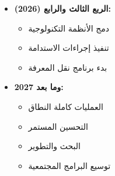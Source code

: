 \begin{itemize}
    \item \textbf{الربع الثالث والرابع (2026):}
    \begin{itemize}
        \item دمج الأنظمة التكنولوجية
        \item تنفيذ إجراءات الاستدامة
        \item بدء برنامج نقل المعرفة
    \end{itemize}
    
    \item \textbf{2027 وما بعد:}
    \begin{itemize}
        \item العمليات كاملة النطاق
        \item التحسين المستمر
        \item البحث والتطوير
        \item توسيع البرامج المجتمعية
    \end{itemize}
\end{itemize}

